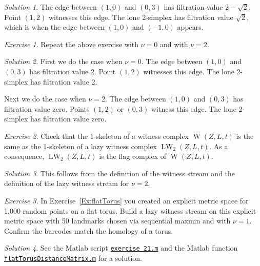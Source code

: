 \documentclass[amscd, amssymb, verbatim]{amsart}[12pt]
\theoremstyle{remark}
\theoremstyle{remark}
\newtheorem{exerciseSol}{Exercise}
\theoremstyle{remark}
\newtheorem*{solution}{Solution}
\DeclareMathOperator{\W}{W}
\DeclareMathOperator{\LW}{LW}
\begin{document}
\begin{solution}
The edge between $(1, 0)$ and $(0, 3)$ has filtration value $2-\sqrt{2}$. Point $(1, 2)$ witnesses this edge. The lone 2-simplex has filtration value $\sqrt{2}$, which is when the edge between $(1, 0)$ and $(-1, 0)$ appears. 
\end{solution}

\begin{exerciseSol}
Repeat the above exercise with $\nu = 0$ and with $\nu = 2$.
\end{exerciseSol}

\begin{solution}
First we do the case when $\nu = 0$. The edge between $(1, 0)$ and $(0, 3)$ has filtration value 2. Point $(1, 2)$ witnesses this edge. The lone 2-simplex has filtration value 2. 

Next we do the case when $\nu = 2$. The edge between $(1, 0)$ and $(0, 3)$ has filtration value zero. Points $(1, 2)$ or $(0, 3)$ witness this edge. The lone 2-simplex has filtration value zero. 
\end{solution}

\begin{exerciseSol}
Check that the 1-skeleton of a witness complex $\W(Z,L,t)$ is the same as the 1-skeleton of a lazy witness complex $\LW_2(Z,L,t)$. As a consequence, $\LW_2(Z,L,t)$ is the flag complex of $\W(Z,L,t)$.
\end{exerciseSol}

\begin{solution}
This follows from the definition of the witness stream and the definition of the lazy witness stream for $\nu = 2$. 
\end{solution}

\begin{exerciseSol}
In Exercise~\ref{Ex:flatTorus} you created an explicit metric space for 1,000 random points on a flat torus. Build a lazy witness stream on this explicit metric space with 50 landmarks chosen via sequential maxmin and with $\nu = 1$.  Confirm the barcodes match the homology of a torus. 
\end{exerciseSol}

\begin{solution}
See the Matlab script \href{https://github.com/appliedtopology/javaplex/tree/master/src/matlab/for_distribution/tutorial_solutions/exercise_21.m}{\texttt{exercise\_21.m}} and the Matlab function \href{https://github.com/appliedtopology/javaplex/tree/master/src/matlab/for_distribution/tutorial_solutions/flatTorusDistanceMatrix.m}{\texttt{flatTorusDistanceMatrix.m}} for a solution.
\end{solution}
\end{document}
